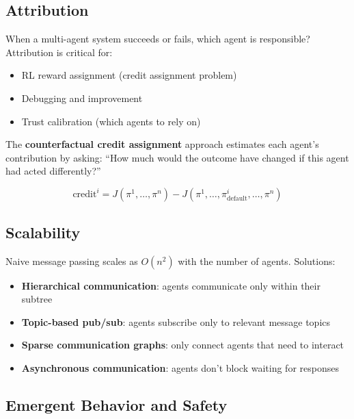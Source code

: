 \subsection{Attribution}
\label{attribution}

When a multi-agent system succeeds or fails, which agent is responsible? Attribution is critical for:

\begin{itemize}
  \item RL reward assignment (credit assignment problem)
  \item Debugging and improvement
  \item Trust calibration (which agents to rely on)
\end{itemize}

The \textbf{counterfactual credit assignment} approach estimates each agent’s contribution by asking: ``How much would the outcome have changed if this agent had acted differently?''

\begin{equation}
  \text{credit}^i = J(\pi^1, \ldots, \pi^n) - J(\pi^1, \ldots, \pi^{i}_{\text{default}}, \ldots, \pi^n)
\label{eq:counterfactual-credit}
\end{equation}

\subsection{Scalability}
\label{scalability}

Naive message passing scales as $O(n^2)$ with the number of agents. Solutions:

\begin{itemize}
  \item \textbf{Hierarchical communication}: agents communicate only within their subtree
  \item \textbf{Topic-based pub/sub}: agents subscribe only to relevant message topics
  \item \textbf{Sparse communication graphs}: only connect agents that need to interact
  \item \textbf{Asynchronous communication}: agents don’t block waiting for responses
\end{itemize}

\subsection{Emergent Behavior and Safety}
\label{emergent-behavior-and-safety}

